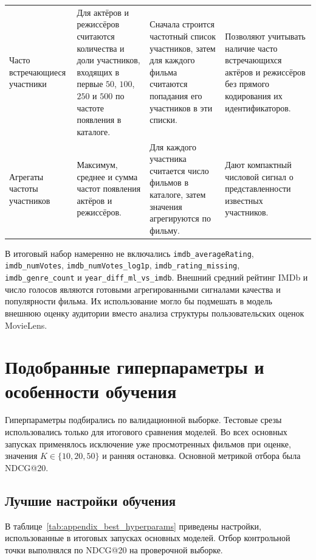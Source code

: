 \documentclass[12pt,fleqn]{article}
\begin{document}
\begin{table}[H]
\begin{tabular}{p{}p{}p{}p{}}
\addlinespace
Часто встречающиеся участники & Для актёров и режиссёров считаются количества и доли участников, входящих в первые $50$, $100$, $250$ и $500$ по частоте появления в каталоге. & Сначала строится частотный список участников, затем для каждого фильма считаются попадания его участников в эти списки. & Позволяют учитывать наличие часто встречающихся актёров и режиссёров без прямого кодирования их идентификаторов. \\
\addlinespace
Агрегаты частоты участников & Максимум, среднее и сумма частот появления актёров и режиссёров. & Для каждого участника считается число фильмов в каталоге, затем значения агрегируются по фильму. & Дают компактный числовой сигнал о представленности известных участников. \\
\bottomrule
\end{tabular}
\end{table}

В итоговый набор намеренно не включались \texttt{imdb\_averageRating},
\texttt{imdb\_numVotes}, \texttt{imdb\_numVotes\_log1p},
\texttt{imdb\_rating\_missing}, \texttt{imdb\_genre\_count} и
\texttt{year\_diff\_ml\_vs\_imdb}. Внешний средний рейтинг IMDb и число голосов
являются готовыми агрегированными сигналами качества и популярности фильма. Их
использование могло бы подмешать в модель внешнюю оценку аудитории вместо
анализа структуры пользовательских оценок MovieLens.

\section{Подобранные гиперпараметры и особенности обучения}
\label{app:experiment_extra}

Гиперпараметры подбирались по валидационной выборке. Тестовые срезы использовались
только для итогового сравнения моделей. Во всех основных запусках применялось исключение уже просмотренных фильмов при оценке, значения
$K\in\{10,20,50\}$ и ранняя остановка. Основной метрикой отбора была NDCG@20. 

\subsection{Лучшие настройки обучения}

В таблице~\ref{tab:appendix_best_hyperparams} приведены настройки, использованные
в итоговых запусках основных моделей. Отбор контрольной точки выполнялся по
NDCG@20 на проверочной выборке.
\end{document}
